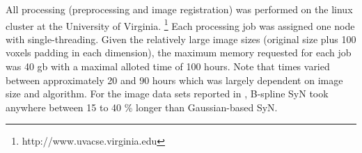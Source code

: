 \documentclass{llncs}
\begin{document}
All processing (preprocessing and image registration) was performed on the
linux cluster at the University of Virginia.%
\footnote{
http://www.uvacse.virginia.edu
} 
Each processing job was assigned one node with single-threading.  Given the 
relatively large image sizes (original size plus 100 voxels padding in 
each dimension), the maximum memory requested for each job was 40 gb with 
a maximal alloted time of 100 hours.  Note that times varied between 
approximately 20 and 90 hours which was largely dependent on image size
and algorithm.  For the image data sets reported in \cite{tustison2013}, 
B-spline SyN took anywhere between 15 to 40 \% longer than Gaussian-based
SyN.



\end{document}
